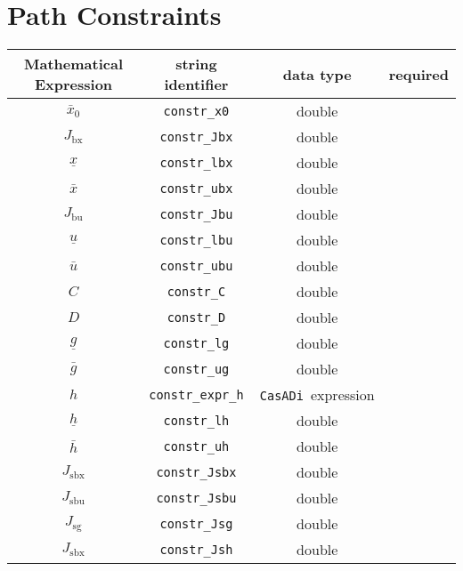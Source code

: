 \documentclass{article}
\newcommand{\code}[1]{\texttt{#1}}
\newcommand{\casadi}{\texttt{CasADi}}
\newcommand{\ind}[1]{_{\textrm{#1}}}
\begin{document}
\section{Path Constraints}
\begin{table}[h]
	\centering
	\begin{tabular}{|c|c|c|c|}
		\toprule
		Mathematical Expression & string identifier & data type & required \\ \midrule
		$ \bar{x}_0 $ & \code{constr\_x0} & double & \mandatory \\ \midrule
		$J_{\textrm{bx}}$ & \code{constr\_Jbx}    & double  & \optional  \\
		$\underline{x} $    & \code{constr\_lbx}     & double  & \optional  \\
		$\bar{x} $         & \code{constr\_ubx}     & double  & \optional   \\ \midrule
		$J_{\textrm{bu}}$ & \code{constr\_Jbu}    & double  & \optional    \\
		$\underline{u} $    & \code{constr\_lbu}     & double   & \optional   \\
		$\bar{u} $         & \code{constr\_ubu}     & double  & \optional   \\ \midrule
		$C$ & \code{constr\_C}    & double  & \optional    \\
		$D $    & \code{constr\_D}     & double    \\
		$\underline{g} $    & \code{constr\_lg}     & double  & \optional    \\
		$\bar{g} $         & \code{constr\_ug}     & double  & \optional   \\ \midrule
		$ h $ & \code{constr\_expr\_h}    & \casadi~expression  & \optional   \\
		$\underline{h} $    & \code{constr\_lh}     & double   & \optional   \\
		$\bar{h} $         & \code{constr\_uh}     & double  & \optional   \\ \midrule
		$ J\ind{sbx} $ & \code{constr\_Jsbx} & double & \optional  \\
		$ J\ind{sbu} $ & \code{constr\_Jsbu} & double  & \optional \\
		$ J\ind{sg} $ & \code{constr\_Jsg} & double & \optional  \\
		$ J\ind{sbx} $ & \code{constr\_Jsh} & double  & \optional  \\
		\bottomrule
	\end{tabular}
\end{table}
\end{document}
